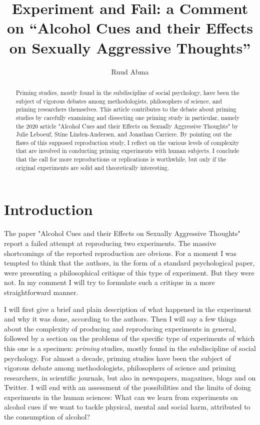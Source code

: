 \documentclass[twocolumn, serif, authordate, reflection]{jote-article}
\title{Experiment and Fail: a Comment on ``Alcohol Cues and their Effects on Sexually Aggressive Thoughts”}
\author[1]{Ruud Abma}
\affil[1]{Descartes Centre for the History and Philosophy of the Sciences and the Humanities, Utrecht University, Utrecht, 3584 CH, Netherlands}
\begin{document}
\cleartoleftpage
\setcounter{page}{20}
\begin{frontmatter}
\maketitle
\begin{abstract}
Priming studies, mostly found in the subdiscipline of social psychology, have been the subject of vigorous debates among methodologists, philosophers of science, and priming researchers themselves. This article contributes to the debate about priming studies by carefully examining and dissecting one priming study in particular, namely the 2020 article "Alcohol Cues and their Effects on Sexually Aggressive Thoughts" by Julie Leboeuf, Stine Linden-Andersen, and Jonathan Carriere. By pointing out the flaws of this supposed reproduction study, I reflect on the various levels of complexity that are involved in conducting priming experiments with human subjects. I conclude that the call for more reproductions or replications is worthwhile, but only if the original experiments are solid and theoretically interesting.
\end{abstract}
\end{frontmatter}

{}
\section*{Introduction}
The paper "Alcohol Cues and their Effects on Sexually Aggressive Thoughts" \parencite{Leboeuf2020} report a failed attempt at reproducing two experiments. The massive shortcomings of the reported reproduction are obvious. For a moment I was tempted to think that the authors, in the form of a standard psychological paper, were presenting a philosophical critique of this type of experiment. But they were not. In my comment I will try to formulate such a critique in a more straightforward manner.
 
I will first give a brief and plain description of what happened in the experiment and why it was done, according to the authors. Then I will say a few things about the complexity of producing and reproducing experiments in general, followed by a section on the problems of the specific type of experiments of which this one is a specimen: \textit{priming} studies, mostly found in the subdiscipline of social psychology. For almost a decade, priming studies have been the subject of vigorous debate among methodologists, philosophers of science and priming researchers, in scientific journals, but also in newspapers, magazines, blogs and on Twitter. I will end with an assessment of the possibilities and the limits of doing experiments in the human sciences: What can we learn from experiments on alcohol cues if we want to tackle physical, mental and social harm, attributed to the consumption of alcohol?
\end{document}
